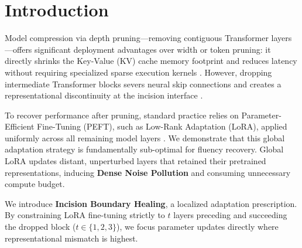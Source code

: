 \documentclass[11pt]{article}
\begin{document}
\section{Introduction}

Model compression via depth pruning---removing contiguous Transformer \citep{vaswani2017attention} layers---offers significant deployment advantages over width or token pruning: it directly shrinks the Key-Value (KV) cache memory footprint and reduces latency without requiring specialized sparse execution kernels \citep{gromov2024unreasonable,siddiqui2024deeper,men-etal-2025-shortgpt}. However, dropping intermediate Transformer blocks severs neural skip connections and creates a representational discontinuity at the incision interface \citep{kim2024shortened,sheth2026cap}.

To recover performance after pruning, standard practice relies on Parameter-Efficient Fine-Tuning (PEFT), such as Low-Rank Adaptation (LoRA), applied uniformly across all remaining model layers \citep{hu2022lora,ma2023llmpruner}. We demonstrate that this global adaptation strategy is fundamentally sub-optimal for fluency recovery. Global LoRA updates distant, unperturbed layers that retained their pretrained representations, inducing \textbf{Dense Noise Pollution} and consuming unnecessary compute budget.

We introduce \textbf{Incision Boundary Healing}, a localized adaptation prescription. By constraining LoRA fine-tuning strictly to $t$ layers preceding and succeeding the dropped block ($t \in \{1, 2, 3\}$), we focus parameter updates directly where representational mismatch is highest. 
\end{document}
